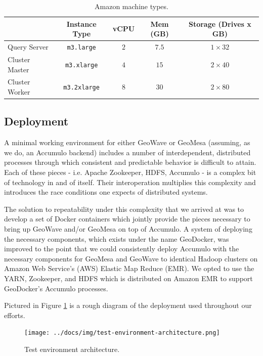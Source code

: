 \begin{table}[h!tb]
  \centering
  \begin{tabular}{ | l | c | c | c | c | }
    \hline
    & Instance Type & vCPU & Mem (GB) & Storage (Drives x GB) \\ \hline
    Query Server & \texttt{m3.large} & $2$ & $7.5$ & $1\times32$ \\
    Cluster Master & \texttt{m3.xlarge} & $4$ & $15$ & $2\times40$ \\
    Cluster Worker & \texttt{m3.2xlarge} & $8$ & $30$ & $2\times80$ \\
    \hline
  \end{tabular}
  \caption{Amazon machine types.}
  \label{table:machines}
\end{table}

\subsection{Deployment}
\label{sec:performance:deployment}

A minimal working environment for either GeoWave or GeoMesa (assuming, as we do, an Accumulo backend) includes a number of interdependent, distributed processes through which consistent and predictable behavior is difficult to attain.
Each of these pieces - i.e. Apache Zookeeper, HDFS, Accumulo - is a complex bit of technology in and of itself. Their interoperation multiplies this complexity and introduces the race conditions one expects of distributed systems.

The solution to repeatability under this complexity that we arrived at was to develop a set of Docker containers which jointly provide the pieces necessary to bring up GeoWave and/or GeoMesa on top of Accumulo.
A system of deploying the necessary components, which exists under the name GeoDocker, was improved to the point that we could consistently deploy Accumulo with the necessary components for GeoMesa and GeoWave to identical Hadoop clusters on Amazon Web Service's (AWS) Elastic Map Reduce (EMR).
We opted to use the YARN, Zookeeper, and HDFS which is distributed on Amazon EMR to support GeoDocker’s Accumulo processes.

Pictured in Figure \ref{deployment} is a rough diagram of the deployment used throughout our efforts.

\begin{figure}[h!tb]
  \centering
  \texttt{[image: ../docs/img/test-environment-architecture.png]}
  \caption{Test environment architecture.}
  \label{deployment}
\end{figure}


